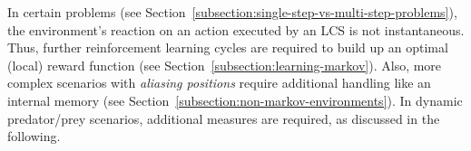 


In certain problems (see Section~\ref{subsection:single-step-vs-multi-step-problems}), the environment's reaction on an action executed by an LCS is not instantaneous. Thus, further reinforcement learning cycles are required to build up an optimal (local) reward function (see Section~\ref{subsection:learning-markov}). Also, more complex scenarios with \emph{aliasing positions} require additional handling like an internal memory (see Section~\ref{subsection:non-markov-environments}). In dynamic predator/prey scenarios, additional measures are required, as discussed in the following.


